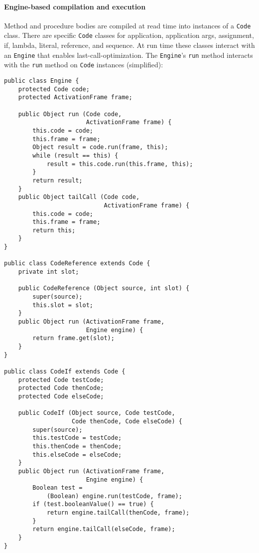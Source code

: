 \documentclass{acm-final/sig-alternate-modified}
\begin{document}
\paragraph{Engine-based compilation and execution}

Method and procedure bodies are compiled at read time into instances
of a {\tt Code} class.  There are specific {\tt Code} classes for
application, application args, assignment, if, lambda, literal,
reference, and sequence.  At run time these classes interact with an
{\tt Engine} that enables last-call-optimization.  The {\tt Engine}'s
{\tt run} method interacts with the {\tt run} method on {\tt Code}
instances (simplified):

\small
\begin{verbatim}
public class Engine {
    protected Code code;
    protected ActivationFrame frame;

    public Object run (Code code,
                       ActivationFrame frame) {
        this.code = code;
        this.frame = frame;
        Object result = code.run(frame, this);
        while (result == this) {
            result = this.code.run(this.frame, this);
        }
        return result;
    }
    public Object tailCall (Code code,
                            ActivationFrame frame) {
        this.code = code;
        this.frame = frame;
        return this;
    }
}

public class CodeReference extends Code {
    private int slot;

    public CodeReference (Object source, int slot) {
        super(source);
        this.slot = slot;
    }
    public Object run (ActivationFrame frame,
                       Engine engine) {
        return frame.get(slot);
    }
}

public class CodeIf extends Code {
    protected Code testCode;
    protected Code thenCode;
    protected Code elseCode;

    public CodeIf (Object source, Code testCode,
                   Code thenCode, Code elseCode) {
        super(source);
        this.testCode = testCode;
        this.thenCode = thenCode;
        this.elseCode = elseCode;
    }
    public Object run (ActivationFrame frame,
                       Engine engine) {
        Boolean test = 
            (Boolean) engine.run(testCode, frame);
        if (test.booleanValue() == true) {
            return engine.tailCall(thenCode, frame);
        }
        return engine.tailCall(elseCode, frame);
    }
}
\end{verbatim}
\normalsize
\end{document}
